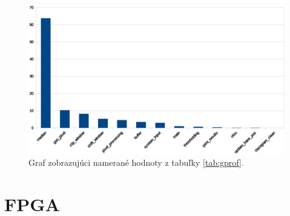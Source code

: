 \documentclass[11pt,a4paper]{article}
\begin{document}
\begin{figure}[H]
    \centering
    \includegraphics[scale=0.6]{graph.eps}
    \caption{Graf zobrazujúci namerané hodnoty z tabuľky \ref{tab:gprof}.}
    \label{fig:graf}
\end{figure}

\newpage
\section{FPGA}

%
%    
\end{document}
